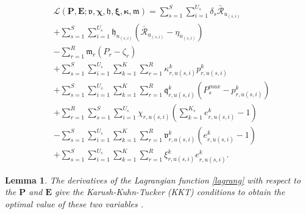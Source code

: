 \documentclass[lettersize,journal]{IEEEtran}
\newtheorem{lemma}{Lemma}
\begin{document}
\begin{subequations}\label{lagrang}
\begin{alignat}{4}
&\mathcal{L}(\boldsymbol{P},\boldsymbol{E}; \boldsymbol{\mathfrak{v}}, \boldsymbol{\chi}, \boldsymbol{\mathfrak{h}}, \boldsymbol{ \xi}, \boldsymbol{ \kappa}, \boldsymbol{\mathfrak{m}})  = \sum\limits_{s=1}^{S} \sum\limits_{i=1}^{U_s}\delta_s\mathcal{\bar{R}}_{u_{(s,i)}}\\
&+\sum\limits_{s=1}^{S} \sum\limits_{i=1}^{U_s}\mathfrak{h}_{u_{(s,i)}} (\mathcal{\bar{R}}_{u_{(s,i)}}-\eta_{u_{(s,i)}})\\
&-  \sum\limits_{r=1}^{R} \mathfrak{m}_{r} (P_{r}- \zeta_r)\\
&+  \sum\limits_{s=1}^{S} \sum\limits_{i=1}^{U_s}\sum\limits_{k=1}^{K} \sum\limits_{r=1}^{R}\kappa^k_{r,u(s,i)}  p^k_{r,u(s,i)}\\
&+  \sum\limits_{s=1}^{S} \sum\limits_{i=1}^{U_s}\sum\limits_{k=1}^{K} \sum\limits_{r=1}^{R}\mathfrak{q}^k_{r,u(s,i)} (P^{max}_{s}- p^k_{r,u(s,i)})\\
&+ \sum\limits_{r=1}^{R}\sum\limits_{s=1}^{S} \sum\limits_{i=1}^{U_s}\chi_{r,u(s,i)}(\sum_{k =1}^{K_s} e^{k}_{r,u(s,i)} -1)\\
&-  \sum\limits_{s=1}^{S} \sum\limits_{i=1}^{U_s}\sum\limits_{k=1}^{K} \sum\limits_{r=1}^{R}\mathfrak{v}^{k}_{r,u(s,i)} (e^{k}_{r,u(s,i)} -1)\\
&+  \sum\limits_{s=1}^{S} \sum\limits_{i=1}^{U_s}\sum\limits_{k=1}^{K} \sum\limits_{r=1}^{R} \xi^{k}_{r,u(s,i)} e^{k}_{r,u(s,i)}.
\end{alignat}
\end{subequations}
\begin{lemma}
The derivatives of the Lagrangian function \eqref{lagrang} with respect to the $\boldsymbol{P}$ and $\boldsymbol{E}$ give the Karush-Kuhn-Tucker (KKT) conditions to obtain the optimal value of these two variables \cite{lee2018dynamic,ali2018joint}.
\end{lemma}
\end{document}
